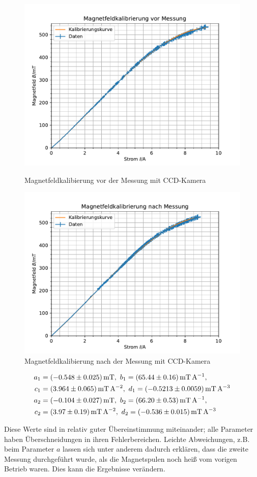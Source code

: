\documentclass{article}
\begin{document}
\begin{multicols}{2}
\begin{figure}[H]
  \centering
  \includegraphics[width=.8\linewidth]{magnetkalib}
  \caption{Magnetfeldkalibierung vor der Messung mit CCD-Kamera}
  \includegraphics[width=.8\linewidth]{magnetkalib2}
  \caption{Magnetfeldkalibierung nach der Messung mit CCD-Kamera}
  \label{fig:magnetkalib}
\end{figure}

\begin{align*}
  a_1&=\SI{-0.548 \pm 0.025}{\mT},\ b_1=\SI{65.44 \pm 0.16}{\mT\per\A}, \\
  c_1&=\SI{3.964 \pm 0.065}{\mT\per\A\squared},\ d_1=\SI{-0.5213 \pm 0.0059}{\mT\per\A\cubed} \\
  a_2&=\SI{-0.104 \pm 0.027}{\mT},\ b_2=\SI{66.20 \pm 0.53}{\mT\per\A}, \\
  c_2&=\SI{3.97 \pm 0.19}{\mT\per\A\squared},\ d_2=\SI{-0.536 \pm 0.015}{\mT\per\A\cubed}
\end{align*}

Diese Werte sind in relativ guter Übereinstimmung miteinander; alle Parameter haben Überschneidungen in ihren Fehlerbereichen.
Leichte Abweichungen, z.B. beim Parameter $a$ lassen sich unter anderem dadurch erklären, dass die zweite Messung durchgeführt wurde,
als die Magnetspulen noch heiß vom vorigen Betrieb waren. Dies kann die Ergebnisse verändern.


\end{multicols}
\end{document}
